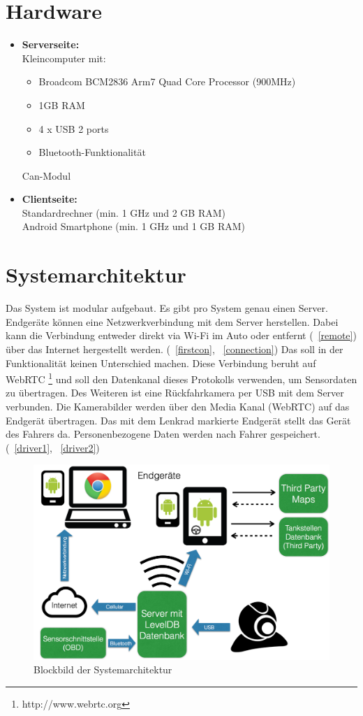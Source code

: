 \documentclass[pflichtenheft.tex]{subfiles}
\begin{document}
\section{Hardware}
\begin{itemize}
\item
\textbf{Serverseite:}\\
Kleincomputer mit:
\begin{itemize}
\item
Broadcom BCM2836 Arm7 Quad Core Processor (900MHz)
\item
1GB RAM
\item
4 x USB 2 ports
\item
Bluetooth-Funktionalität
\end{itemize}
Can-Modul
\item
\textbf{Clientseite:}\\
Standardrechner (min. 1 GHz und 2 GB RAM)\\
Android Smartphone (min. 1 GHz und 1 GB RAM)
\end{itemize}


\newpage
\section{Systemarchitektur}

Das System ist modular aufgebaut. Es gibt pro System genau einen Server. Endgeräte können eine Netzwerkverbindung mit dem Server herstellen. Dabei kann die Verbindung entweder direkt via Wi-Fi im Auto oder entfernt (~\ref{remote}) über das Internet hergestellt werden. (~\ref{firstcon}, ~\ref{connection}) Das soll in der Funktionalität keinen Unterschied machen. Diese Verbindung beruht auf WebRTC \footnote{http://www.webrtc.org} und soll den Datenkanal dieses Protokolls verwenden, um Sensordaten zu übertragen. Des Weiteren ist eine Rückfahrkamera per USB mit dem Server verbunden. Die Kamerabilder werden über den Media Kanal (WebRTC) auf das Endgerät übertragen. Das mit dem Lenkrad markierte Endgerät stellt das Gerät des Fahrers da. Personenbezogene Daten werden nach Fahrer gespeichert. (~\ref{driver1}, ~\ref{driver2})

\begin{figure}[H]
  	\begin{center}
 		\includegraphics[width=\textwidth]{Images/sysarch.png}
  		\caption{Blockbild der Systemarchitektur}
  	\end{center}
\end{figure}
\end{document}
